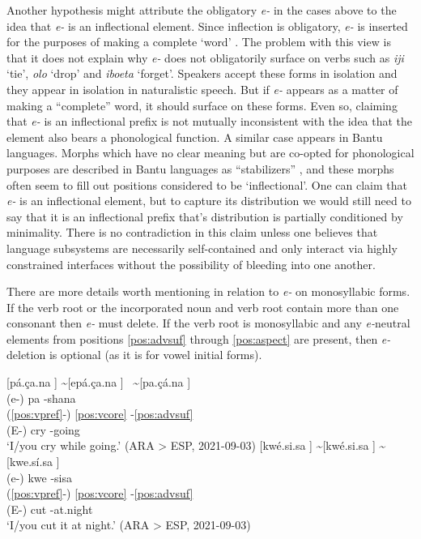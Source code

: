 \documentclass[output=paper,hidelinks]{langscibook}
\begin{document}
Another hypothesis might attribute the obligatory \textit{e-} in the cases above to the idea that \textit{e-} is an inflectional element. Since inflection is obligatory, \textit{e-} is inserted for the purposes of making a complete `word' \citep{Guillaume2008, guillaume:forthcoming}. The problem with this view is that it does not explain why \textit{e-} does not obligatorily surface on verbs such as \textit{iji} `tie', \textit{olo} `drop' and \textit{iboeta} `forget'. Speakers accept these forms in isolation and they appear in isolation in naturalistic speech. But if \textit{e-} appears as a matter of making a ``complete'' word, it should surface on these forms. Even so, claiming that \textit{e-} is an inflectional prefix is not mutually inconsistent with the idea that the element also bears a phonological function. A similar case appears in Bantu languages. Morphs which have no clear meaning but are co-opted for phonological purposes are described in Bantu languages as ``stabilizers'' \citep{gowlett2007}, and these morphs often seem to fill out positions considered to be `inflectional'. One can claim that \textit{e-} is an inflectional element, but to capture its distribution we would still need to say that it is an inflectional prefix that's distribution is partially conditioned by minimality. There is no contradiction in this claim unless one believes that language subsystems are necessarily self-contained and only interact via highly constrained interfaces without the possibility of bleeding into one another.

There are more details worth mentioning in relation to \textit{e-} on monosyllabic forms. If the verb root or the incorporated noun and verb root contain more than one consonant then \textit{e-} must delete. If the verb root is monosyllabic and any \textit{e-}neutral elements from positions \ref{pos:advsuf} through \ref{pos:aspect} are present, then \textit{e-} deletion is optional (as it is for vowel initial forms).


\ea 
 \ea\label{ex:e...shana}
    [pá.ça.na \downarrow] \sim [epá.ça.na \downarrow] \
    \sim [pa.çá.na \downarrow] \\
    \glll (e-) pa -shana   \\ 
    (\ref{pos:vpref}-) \ref{pos:vcore} -\ref{pos:advsuf}     \\
    (E-) cry -going    \\
    \glt  `I/you cry while going.' \hfill (ARA > ESP, 2021-09-03)
 \ex\label{ex:e...sisa}
    [kwé.si.sa \downarrow] \sim [kwé.si.sa \downarrow] \sim [kwe.sí.sa \downarrow]  \\
    \glll (e-) kwe -sisa \\ 
    (\ref{pos:vpref}-) \ref{pos:vcore} -\ref{pos:advsuf} \\
    (E-) cut -at.night    \\
    \glt  `I/you cut it at night.' \hfill (ARA > ESP, 2021-09-03)
 \z
\z 
\end{document}
